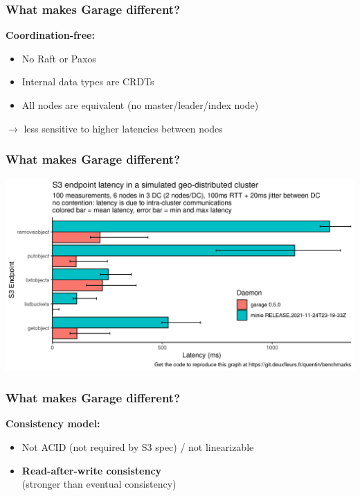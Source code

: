 \documentclass[aspectratio=169]{beamer}
\begin{document}
\begin{frame}
	\frametitle{What makes Garage different?}
	\textbf{Coordination-free:}
			\vspace{2em}
	\begin{itemize}
		\item No Raft or Paxos
			\vspace{1em}
		\item Internal data types are CRDTs
			\vspace{1em}
		\item All nodes are equivalent (no master/leader/index node)
	\end{itemize}
			\vspace{2em}
	$\to$ less sensitive to higher latencies between nodes
\end{frame}

\begin{frame}
	\frametitle{What makes Garage different?}
		\begin{center}
			\includegraphics[width=.9\linewidth]{assets/endpoint-latency-dc.png}
		\end{center}
\end{frame}

\begin{frame}
	\frametitle{What makes Garage different?}
	\textbf{Consistency model:}
			\vspace{2em}
	\begin{itemize}
		\item Not ACID (not required by S3 spec) / not linearizable
			\vspace{1em}
		\item \textbf{Read-after-write consistency}\\
			{\footnotesize (stronger than eventual consistency)}
	\end{itemize}
\end{frame}
\end{document}
